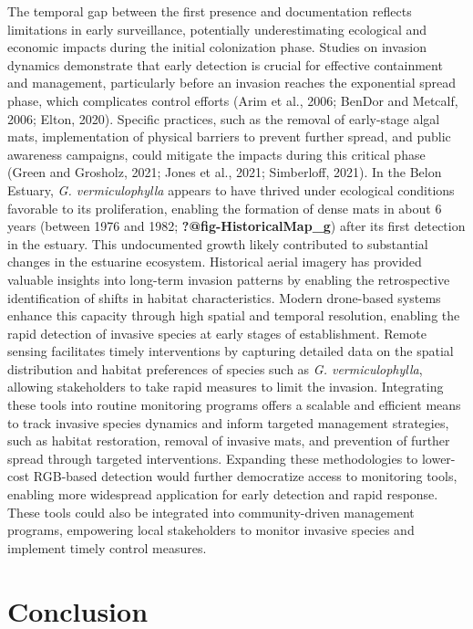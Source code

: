 \documentclass[
  letterpaper,
  11pt,
  english,
  singlespacing,
  headsepline]{MastersDoctoralThesis}
\begin{document}
\begin{spacing}{1.5}
The temporal gap between the first presence and documentation reflects
limitations in early surveillance, potentially underestimating
ecological and economic impacts during the initial colonization phase.
Studies on invasion dynamics demonstrate that early detection is crucial
for effective containment and management, particularly before an
invasion reaches the exponential spread phase, which complicates control
efforts (Arim et al., 2006; BenDor and Metcalf, 2006; Elton, 2020).
Specific practices, such as the removal of early-stage algal mats,
implementation of physical barriers to prevent further spread, and
public awareness campaigns, could mitigate the impacts during this
critical phase (Green and Grosholz, 2021; Jones et al., 2021;
Simberloff, 2021). In the Belon Estuary, \emph{G. vermiculophylla}
appears to have thrived under ecological conditions favorable to its
proliferation, enabling the formation of dense mats in about 6 years
(between 1976 and 1982; \textbf{?@fig-HistoricalMap\_g}) after its first
detection in the estuary. This undocumented growth likely contributed to
substantial changes in the estuarine ecosystem. Historical aerial
imagery has provided valuable insights into long-term invasion patterns
by enabling the retrospective identification of shifts in habitat
characteristics. Modern drone-based systems enhance this capacity
through high spatial and temporal resolution, enabling the rapid
detection of invasive species at early stages of establishment. Remote
sensing facilitates timely interventions by capturing detailed data on
the spatial distribution and habitat preferences of species such as
\emph{G. vermiculophylla}, allowing stakeholders to take rapid measures
to limit the invasion. Integrating these tools into routine monitoring
programs offers a scalable and efficient means to track invasive species
dynamics and inform targeted management strategies, such as habitat
restoration, removal of invasive mats, and prevention of further spread
through targeted interventions. Expanding these methodologies to
lower-cost RGB-based detection would further democratize access to
monitoring tools, enabling more widespread application for early
detection and rapid response. These tools could also be integrated into
community-driven management programs, empowering local stakeholders to
monitor invasive species and implement timely control measures.

\section{Conclusion}\label{conclusion-1}


\end{spacing}
\end{document}
